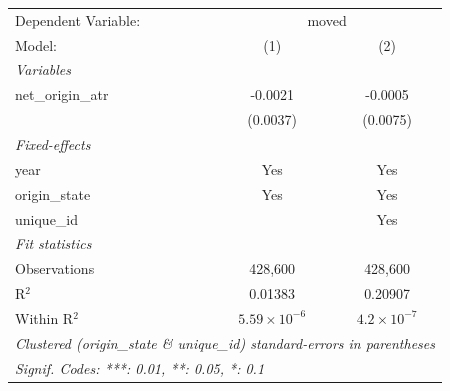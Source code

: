 
\begingroup
\centering
\small
\begin{tabular}{lcc}
   \tabularnewline \midrule \midrule
   Dependent Variable: & \multicolumn{2}{c}{moved}\\
   Model:             & (1)                   & (2)\\  
   \midrule
   \emph{Variables}\\
   net\_origin\_atr   & -0.0021               & -0.0005\\   
                      & (0.0037)              & (0.0075)\\   
   \midrule
   \emph{Fixed-effects}\\
   year               & Yes                   & Yes\\  
   origin\_state      & Yes                   & Yes\\  
   unique\_id         &                       & Yes\\  
   \midrule
   \emph{Fit statistics}\\
   Observations       & 428,600               & 428,600\\  
   R$^2$              & 0.01383               & 0.20907\\  
   Within R$^2$       & $5.59\times 10^{-6}$  & $4.2\times 10^{-7}$\\   
   \midrule \midrule
   \multicolumn{3}{l}{\emph{Clustered (origin\_state \& unique\_id) standard-errors in parentheses}}\\
   \multicolumn{3}{l}{\emph{Signif. Codes: ***: 0.01, **: 0.05, *: 0.1}}\\
\end{tabular}
\par\endgroup


